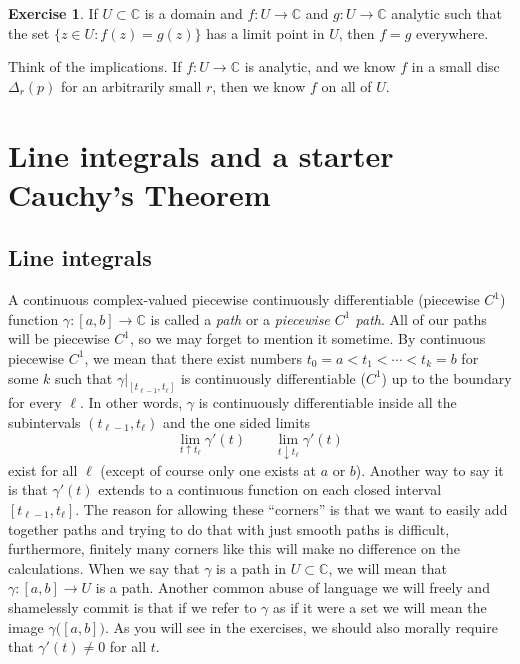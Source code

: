 \documentclass[12pt,openany]{book}
\newcommand{\C}{{\mathbb{C}}}
\newcommand{\myindex}[1]{#1\index{#1}}
\theoremstyle{plain}
\theoremstyle{remark}
\theoremstyle{definition}
\newenvironment{exbox}{%
    \def\FrameCommand{\vrule width 1pt \relax\hspace {10pt}}%
    \MakeFramed {\advance \hsize -\width \FrameRestore }%
}{%
    \endMakeFramed
}
\theoremstyle{exercise}
\newtheorem{exercise}{Exercise}[section]
\theoremstyle{example}
\begin{document}
\begin{exbox}
\begin{exercise}
If $U \subset \C$ is a domain and $f \colon U \to \C$ and $g \colon U \to
\C$
analytic such that the set $\{ z \in U : f(z) = g(z) \}$ has a limit
point in $U$, then $f = g$ everywhere.
\end{exercise}
\end{exbox}

Think of the implications.  If $f \colon U \to \C$ is analytic, and we know
$f$ in a small disc $\Delta_r(p)$ for an arbitrarily small $r$, then
we know $f$ on all of $U$.



\section{Line integrals and a starter Cauchy's Theorem}
\label{sec:cauchysimple}

\subsection{Line integrals}

A continuous complex-valued piecewise continuously
differentiable (piecewise $C^1$) function $\gamma \colon [a,b] \to \C$ 
is called a \emph{\myindex{path}} or a \emph{\myindex{piecewise $C^1$ path}}.
All of our paths will be piecewise $C^1$, so we may forget to mention it
sometime.
By continuous piecewise $C^1$,
we mean that there exist numbers $t_0 = a < t_1 < \cdots
< t_k = b$ for some $k$ such that $\gamma|_{[t_{\ell-1},t_\ell]}$ is
continuously differentiable ($C^1$) up to
the boundary for every $\ell$.
In other words, $\gamma$ is continuously differentiable inside all the
subintervals $(t_{\ell-1},t_\ell)$ and the one sided limits
\begin{equation*}
\lim_{t \uparrow t_\ell} \gamma'(t) \qquad
\lim_{t \downarrow t_\ell} \gamma'(t)
\end{equation*}
exist for all $\ell$ (except of course only one exists at $a$ or $b$).
Another way to say it is that $\gamma'(t)$ extends to a continuous
function on each closed interval $[t_{\ell-1},t_{\ell}]$.
The reason for allowing these ``corners'' is that we want to easily add
together paths and trying to do that with just smooth paths is difficult,
furthermore, finitely many corners like this will make no difference on the
calculations.
When we say that $\gamma$ is a path in $U \subset \C$, we will mean that
$\gamma \colon [a,b] \to U$ is a path.  Another common abuse of language we
will freely and shamelessly commit is that if we refer to $\gamma$
as if it were a set we will mean the image $\gamma\bigl([a,b]\bigr)$.
As you will see in the exercises,
we should also morally require that $\gamma'(t) \not= 0$ for all $t$.
\end{document}
